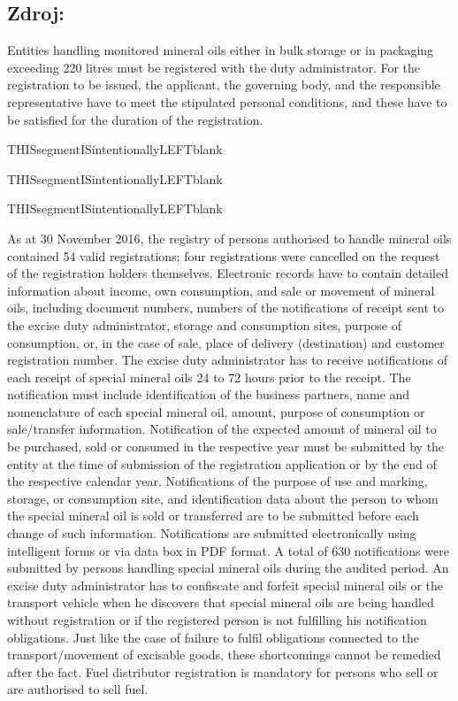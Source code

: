 \documentclass[10pt]{article}
\begin{document}
\subsection*{Zdroj:}

Entities handling monitored mineral oils either in bulk storage or in packaging exceeding 220 litres must be registered with the duty administrator.
For the registration to be issued, the applicant, the governing body, and the responsible representative have to meet the stipulated personal conditions, and these have to be satisfied for the duration of the registration.


THISsegmentISintentionallyLEFTblank



THISsegmentISintentionallyLEFTblank



THISsegmentISintentionallyLEFTblank

As at 30 November 2016, the registry of persons authorised to handle mineral oils contained 54 valid registrations; four registrations were cancelled on the request of the registration holders themselves.
Electronic records have to contain detailed information about income, own consumption, and sale or movement of mineral oils, including document numbers, numbers of the notifications of receipt sent to the excise duty administrator, storage and consumption sites, purpose of consumption, or, in the case of sale, place of delivery (destination) and customer registration number.
The excise duty administrator has to receive notifications of each receipt of special mineral oils 24 to 72 hours prior to the receipt.
The notification must include identification of the business partners, name and nomenclature of each special mineral oil, amount, purpose of consumption or sale/transfer information.
Notification of the expected amount of mineral oil to be purchased, sold or consumed in the respective year must be submitted by the entity at the time of submission of the registration application or by the end of the respective calendar year.
Notifications of the purpose of use and marking, storage, or consumption site, and identification data about the person to whom the special mineral oil is sold or transferred are to be submitted before each change of such information.
Notifications are submitted electronically using intelligent forms or via data box in PDF format.
A total of 630 notifications were submitted by persons handling special mineral oils during the audited period.
An excise duty administrator has to confiscate and forfeit special mineral oils or the transport vehicle when he discovers that special mineral oils are being handled without registration or if the registered person is not fulfilling his notification obligations.
Just like the case of failure to fulfil obligations connected to the transport/movement of excisable goods, these shortcomings cannot be remedied after the fact.
Fuel distributor registration is mandatory for persons who sell or are authorised to sell fuel.
\end{document}
